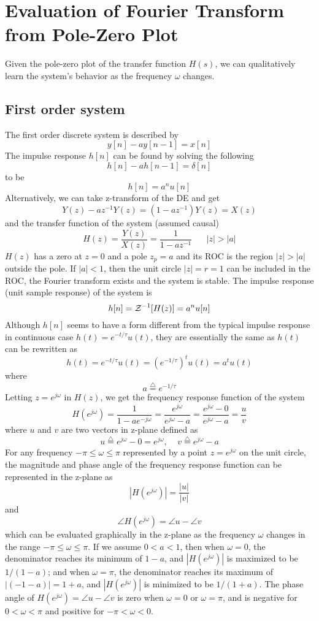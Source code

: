 \newpage
\section*{Evaluation of Fourier Transform from Pole-Zero Plot}

Given the pole-zero plot of the transfer function $H(s)$, we can qualitatively 
learn the system's behavior as the frequency $\omega$ changes.

\subsection*{First order system}

The first order discrete system is described by
\[	y[n]-ay[n-1]=x[n] 	\]
The impulse response $h[n]$ can be found by solving the following
\[	h[n]-ah[n-1]=\delta[n] 	\]
to be
\[	h[n]=a^n u[n]	\]
Alternatively, we can take z-transform of the DE and get
\[	Y(z)-az^{-1}Y(z)=(1-az^{-1})Y(z)=X(z)	\]
and the transfer function of the system (assumed causal)
\[	H(z)=\frac{Y(z)}{X(z)}=\frac{1}{1-az^{-1}} \;\;\;\;\;\;|z|>|a|	\]
$H(z)$ has a zero at $z=0$ and a pole $z_p=a$ and its ROC is the region 
$|z|>|a|$ outside the pole. If $|a|<1$, then the unit circle $|z|=r=1$ can be
included in the ROC, the Fourier transform exists and the system is stable. The 
impulse response 
(unit sample response) of the system is
\[	h[n]={\cal Z}^{-1}[H(z)]=a^nu[n]	\]
Although $h[n]$ seems to have a form different from the typical impulse response
in continuous case $h(t)=e^{-t/\tau}u(t)$, they are essentially the same as $h(t)$
can be rewritten as
\[	h(t)=e^{-t/\tau}u(t)=(e^{-1/\tau})^t u(t)=a^t u(t)	\]
where 
\[	a \stackrel{\triangle}{=}e^{-1/\tau}	\]
Letting $z=e^{j\omega}$ in $H(z)$, we get the frequency response function of the
system
\[	H(e^{j\omega})=\frac{1}{1-ae^{-j\omega}}
	=\frac{e^{j\omega}}{e^{j\omega}-a}=\frac{e^{j\omega}-0}{e^{j\omega}-a}
	=\frac{u}{v}		\]
where $u$ and $v$ are two vectors in z-plane defined as
\[	u\stackrel{\triangle}{=}e^{j\omega}-0=e^{j\omega},\;\;\;\;
	v\stackrel{\triangle}{=}e^{j\omega}-a	\]
For any frequency $-\pi \le\omega\le\pi$ represented by a point $z=e^{j\omega}$
on the unit circle, the magnitude and phase angle of the frequency response
function can be represented in the z-plane as
\[	|H(e^{j\omega})|=\frac{|u|}{|v|}	\]
and 
\[	\angle H(e^{j\omega})=\angle u-\angle v	\]
which can be evaluated graphically in the z-plane as the frequency $\omega$ changes
in the range $-\pi \le \omega \le\pi$. If we assume $0<a< 1$, then when $\omega=0$,
the denominator reaches its minimum of $1-a$, and $|H(e^{j\omega})|$ is maximized
to be $1/(1-a)$; and when $\omega=\pi$, the denominator reaches its maximum of 
$|(-1-a)|=1+a$, and $|H(e^{j\omega})|$ is minimized to be $1/(1+a)$. 
The phase angle of $H(e^{j\omega})=\angle u-\angle v$ is zero when $\omega=0$ or
$\omega=\pi$, and is negative for $0<\omega<\pi$ and positive for $-\pi<\omega<0$.

